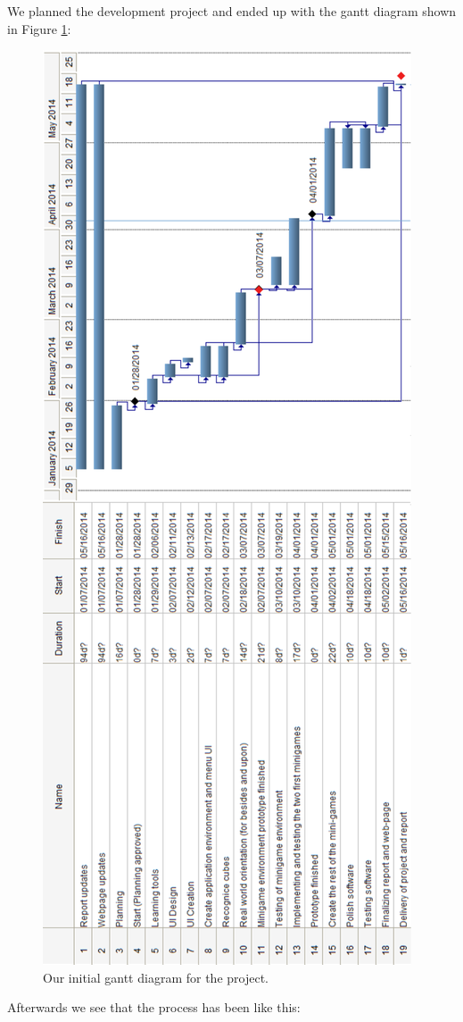 We planned the development project and ended up with the gantt diagram shown in Figure \ref{fig:preplan_gantt}:

\begin{figure}[h]
	\centering
	\includegraphics[height=\textwidth, angle=270]{preplan_gantt_diagram}
	\caption[Preplan Gantt diagram]{Our initial gantt diagram for the project.}
	\label{fig:preplan_gantt}
\end{figure}


Afterwards we see that the process has been like this:






